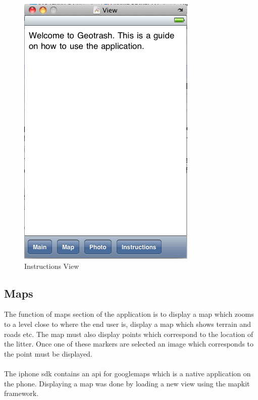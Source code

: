 \documentclass[12pt]{article}
\begin{document}
\begin{figure}[htb]
\begin{center}
\leavevmode
\includegraphics{instruct}
\end{center}
\caption{Instructions View}
\label{fig:instruct}
\end{figure}

\subsection{Maps}

The function of maps section of the application is to display a map which zooms to a level close to where the end user is, display a map which shows terrain and roads etc. The map must also display points which correspond to the location of the litter. Once one of these markers are selected an image which corresponds to the point must be displayed. 

\paragraph{}

The \gls{iphone} \gls{sdk} contains an \gls{api} for \gls{googlemaps} which is a native application on the phone. Displaying a map was done by loading a new view using the \gls{mapkit} framework.
\end{document}
